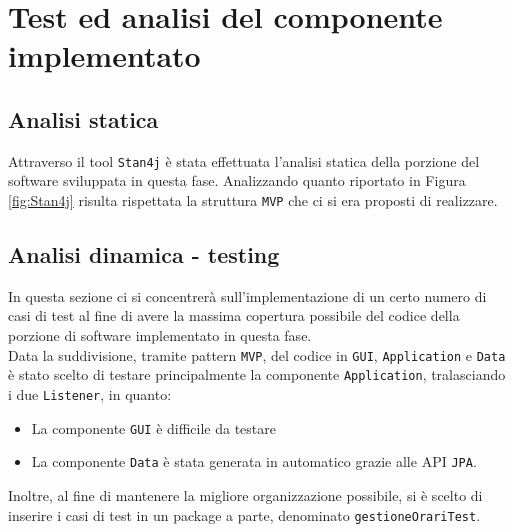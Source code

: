 \chapter{Test ed analisi del componente implementato}
\section{Analisi statica}
Attraverso il tool \verb|Stan4j| è stata effettuata l'analisi statica della porzione del software sviluppata in questa fase.
Analizzando quanto riportato in Figura \ref{fig:Stan4j} risulta rispettata la struttura \verb|MVP| che ci si era proposti di realizzare.
\section{Analisi dinamica - testing}
In questa sezione ci si concentrerà sull'implementazione di un certo numero di casi di test al fine di avere la massima copertura possibile del codice della porzione di software implementato in questa fase.\\

\noindent
Data la suddivisione, tramite pattern \verb|MVP|, del codice in \verb|GUI|, \verb|Application| e \verb|Data| è stato scelto di testare principalmente la componente \verb|Application|,  tralasciando i due \verb|Listener|, in quanto:
\begin{itemize}
	\item La componente \verb|GUI| è difficile da testare
	\item La componente \verb|Data| è stata generata in automatico grazie alle API \verb|JPA|.
\end{itemize}
Inoltre, al fine di mantenere la migliore organizzazione possibile, si è scelto di inserire i casi di test in un package a parte, denominato \verb|gestioneOrariTest|.
